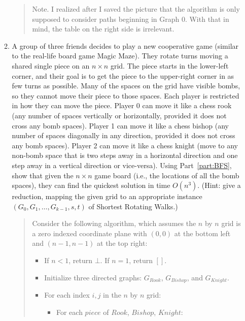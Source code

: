 \documentclass[11pt]{article}
\begin{document}
\begin{enumerate}
\begin{enumerate}
       \newline
       \begin{quote}
           \color{purple}
            Note. I realized after I saved the picture that the algorithm is only supposed to consider paths beginning in Graph 0. With that in mind, the table on the right side is irrelevant.
       \end{quote}
    \item 
        A group of three friends decides to play a new cooperative game (similar to the real-life board game Magic Maze).  They rotate turns moving a shared single piece on an $n\times n$ grid.  The piece starts in the lower-left corner, and their goal is to get the piece to the upper-right corner in as few turns as possible.  Many of the spaces on the grid have visible bombs, so they cannot move their piece to those spaces.  Each player is restricted in how they can move the piece.  Player 0 can move it like a chess rook (any number of spaces vertically or horizontally, provided it does not cross any bomb spaces). Player 1 can move it like a chess bishop (any number of spaces diagonally in any direction, provided it does not cross any bomb spaces).  Player 2 can move it like a chess knight (move to any non-bomb space that is two steps away in a horizontal direction and one step away in a vertical direction or vice-versa).   Using Part~\ref{part:BFS}, show that given the $n\times n$ game board (i.e., the locations of all the bomb spaces), they can find the quickest solution in time $O(n^3)$.  
        (Hint: give a reduction, mapping the given grid to an appropriate instance $(G_0,G_1,\ldots,G_{k-1},s,t)$ of Shortest Rotating Walks.)
        \begin{quote}
            \color{purple}
            Consider the following algorithm, which assumes the $n$ by $n$ grid is a zero indexed coordinate plane with $(0, 0)$ at the bottom left and $(n - 1, n - 1)$ at the top right: 
            \vspace{1em}
            \begin{itemize}
                \item If $n < 1$, return $\bot$. If $n = 1$, return $[]$.
                \item Initialize three directed graphs: $G_{Rook}$, $G_{Bishop}$, and $G_{Knight}$. 
                \item For each index $i, j$ in the $n$ by $n$ grid:
                \begin{itemize}
                    \item For each $piece$ of $Rook$, $Bishop$, $Knight$:

\end{itemize}
\end{itemize}
\end{quote}
\end{enumerate}
\end{enumerate}
\end{document}
